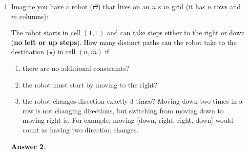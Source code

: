 \documentclass[12pt]{article}
\renewcommand{\(}{\left(}
\renewcommand{\)}{\right)}
\theoremstyle{definition}
\newtheorem*{answer}{Answer}
\begin{document}
\begin{enumerate}
    \begin{shaded}
    \begin{answer}

    \end{answer}
    \end{shaded}
    \newpage


\item Imagine you have a robot ($\Theta$) that lives on an $n \times m$ grid (it has $n$ rows and $m$ columns):
%
\begin{center}
\end{center}
%
The robot starts in cell $(1, 1)$ and can take steps either to the right or down (\textbf{no left or up
steps}). How many distinct paths can the robot take to the destination ($\star$) in cell $(n, m)$ if
    \begin{enumerate}[label=\alph*.]

    \item there are no additional constraints?
    \item the robot must start by moving to the right?
    \item the robot changes direction exactly 3 times? Moving down two times in a
row is not changing directions, but switching from moving down to moving right is. 
For example, moving [down, right, right, down] would count as having two direction changes.

    \end{enumerate}

    \begin{shaded}
    \begin{answer}

    \end{answer}
    \end{shaded}
    \newpage



\end{enumerate}
\end{document}
